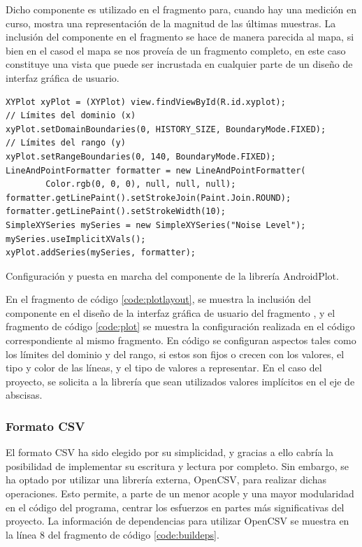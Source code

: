     Dicho componente es utilizado en el fragmento  para, cuando hay una medición en curso, mostra una representación de la magnitud de las últimas muestras. La inclusión del componente en el fragmento se hace de manera parecida al mapa, si bien en el casod el mapa se nos proveía de un fragmento completo, en este caso  constituye una vista que puede ser incrustada en cualquier parte de un diseño de interfaz gráfica de usuario. 
        
\begin{listing}[h] 
\begin{verbatim}
XYPlot xyPlot = (XYPlot) view.findViewById(R.id.xyplot);
// Límites del dominio (x)
xyPlot.setDomainBoundaries(0, HISTORY_SIZE, BoundaryMode.FIXED);
// Límites del rango (y)
xyPlot.setRangeBoundaries(0, 140, BoundaryMode.FIXED);
LineAndPointFormatter formatter = new LineAndPointFormatter(
        Color.rgb(0, 0, 0), null, null, null);
formatter.getLinePaint().setStrokeJoin(Paint.Join.ROUND);
formatter.getLinePaint().setStrokeWidth(10);
SimpleXYSeries mySeries = new SimpleXYSeries("Noise Level");
mySeries.useImplicitXVals();
xyPlot.addSeries(mySeries, formatter);
\end{verbatim}
\caption{Configuración y puesta en marcha del componente  de la librería AndroidPlot.}
\label{code:plot}
\end{listing}
    
    En el fragmento de código \ref{code:plotlayout}, se muestra la inclusión del componente en el diseño de la interfaz gráfica de usuario del fragmento , y el fragmento de código \ref{code:plot} se muestra la configuración realizada en el código correspondiente al mismo fragmento. En código se configuran aspectos tales como los límites del dominio y del rango, si estos son fijos o crecen con los valores, el tipo y color de las líneas, y el tipo de valores a representar. En el caso del proyecto, se solicita a la librería que sean utilizados valores implícitos en el eje de abscisas.

\subsubsection{Formato CSV}
    El formato CSV ha sido elegido por su simplicidad, y gracias a ello cabría la posibilidad de implementar su escritura y lectura por completo. Sin embargo, se ha optado por utilizar una librería externa, OpenCSV, para realizar dichas operaciones. Esto permite, a parte de un menor acople y una mayor modularidad en el código del programa, centrar los esfuerzos en partes más significativas del proyecto. La información de dependencias para utilizar OpenCSV se muestra en la línea 8 del fragmento de código \ref{code:buildeps}. 
    
